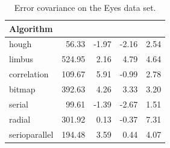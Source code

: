 \begin{table}[h]
\centering
\begin{tabular}{l@{\hspace{1.5cm}}D{.}{.}{3.2}D{.}{.}{3.2}D{.}{.}{3.2}D{.}{.}{3.2}}
\toprule
\textbf{Algorithm} &  &  &  & \\
\midrule
hough & 56.33 & -1.97 & -2.16 & 2.54\\
limbus & 524.95 & 2.16 & 4.79 & 4.64\\
correlation & 109.67 & 5.91 & -0.99 & 2.78\\
bitmap & 392.63 & 4.26 & 3.33 & 3.20\\
serial & 99.61 & -1.39 & -2.67 & 1.51\\
radial & 301.92 & 0.13 & -0.37 & 7.31\\
serioparallel & 194.48 & 3.59 & 0.44 & 4.07\\
\bottomrule
\end{tabular}
\caption{Error covariance on the Eyes data set.}\label{t:algo-covar-eyes}
\end{table}

